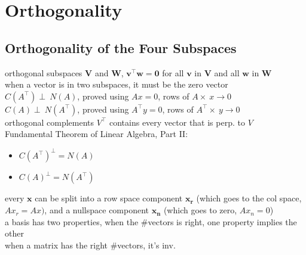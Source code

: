 \documentclass{report}
\begin{document}
\chapter{Orthogonality}
\section{Orthogonality of the Four Subspaces}
orthogonal subspaces $\mathbf{V}$ and $\mathbf{W}$, $\mathbf{v}^\top \mathbf{w} = \mathbf{0}$ for all $\mathbf{v}$ 
in $\mathbf{V}$ and all $\mathbf{w}$ in $\mathbf{W}$ \\
when a vector is in two subspaces, it must be the zero vector \\
$C(A^\top) \perp \ N(A)$, proved using $Ax = 0$, rows of $A \times \ x \rightarrow 0$ \\
$C(A) \perp \ N(A^\top)$, proved using $A^\top y = 0$, rows of $A^\top \times \ y \rightarrow 0$ \\
orthogonal complements $V^\top$ contains every vector that is perp. to $V$ \\
Fundamental Theorem of Linear Algebra, Part \textrm{II}: 
\begin{itemize}
    \item $C(A^\top)^\perp = N(A)$ 
    \item $C(A)^\perp = N(A^\top)$
\end{itemize}
every $\mathbf{x}$ can be split into a row space component $\mathbf{x_r}$ (which goes to the col space, $Ax_r = Ax)$, 
and a nullspace component $\mathbf{x_n}$ (which goes to zero, $Ax_n = 0$) \\
a basis has two properties, when the \#vectors is right, one property implies the other \\
when a matrix has the right \#vectors, it's inv.
\end{document}
